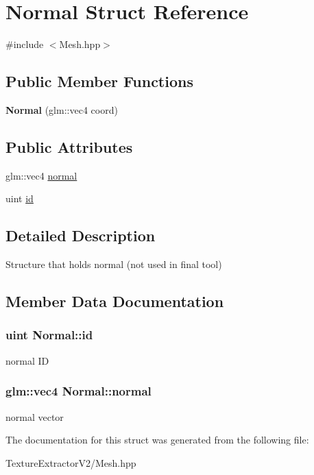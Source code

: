 \hypertarget{struct_normal}{}\section{Normal Struct Reference}
\label{struct_normal}


{\ttfamily \#include $<$Mesh.\+hpp$>$}

\subsection*{Public Member Functions}
\begin{DoxyCompactItemize}
\item 
\hypertarget{struct_normal_a19c72c824df84768e56cd6c610bf8edd}{}{\bfseries Normal} (glm\+::vec4 coord)\label{struct_normal_a19c72c824df84768e56cd6c610bf8edd}

\end{DoxyCompactItemize}
\subsection*{Public Attributes}
\begin{DoxyCompactItemize}
\item 
glm\+::vec4 \hyperlink{struct_normal_a555de7ec7d67e743968b5f69af17dd1c}{normal}
\item 
uint \hyperlink{struct_normal_a39256c233377305342349bd73991d3e3}{id}
\end{DoxyCompactItemize}


\subsection{Detailed Description}
Structure that holds normal (not used in final tool) 

\subsection{Member Data Documentation}
\hypertarget{struct_normal_a39256c233377305342349bd73991d3e3}{}
\subsubsection[{id}]{\setlength{\rightskip}{0pt plus 5cm}uint Normal\+::id}\label{struct_normal_a39256c233377305342349bd73991d3e3}
normal I\+D \hypertarget{struct_normal_a555de7ec7d67e743968b5f69af17dd1c}{}
\subsubsection[{normal}]{\setlength{\rightskip}{0pt plus 5cm}glm\+::vec4 Normal\+::normal}\label{struct_normal_a555de7ec7d67e743968b5f69af17dd1c}
normal vector 

The documentation for this struct was generated from the following file\+:\begin{DoxyCompactItemize}
\item 
Texture\+Extractor\+V2/Mesh.\+hpp\end{DoxyCompactItemize}
